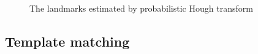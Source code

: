 \begin{figure}[h!]
\centering
{}~~
\caption{The landmarks estimated by probabilistic Hough transform}
\label{fig:figure_31}
\end{figure}
\subsection{Template matching}
